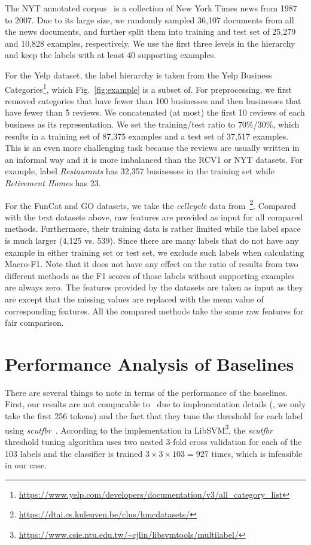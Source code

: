 \documentclass[11pt,a4paper]{article}
\begin{document}
The NYT annotated corpus~\citep{sandhaus2008new} is a collection of New York Times news from 1987 to 2007.
Due to its large size, we randomly sampled 36,107 documents from all the news documents, and further split them into training and test set of 25,279 and 10,828 examples, respectively. 
We use the first three levels in the hierarchy and keep the labels with at least 40 supporting examples.

For the Yelp dataset, the label hierarchy is taken from the Yelp Business Categories\footnote{\url{https://www.yelp.com/developers/documentation/v3/all\_category\_list}}, which Fig.~\ref{fig:example} is a subset of.
For preprocessing, we first removed categories that have fewer than 100 businesses and then businesses that have fewer than 5 reviews.
We concatenated (at most) the first 10 reviews of each business as its representation.
We set the training/test ratio to 70\%/30\%, which results in a training set of 87,375 examples and a test set of 37,517 examples.
This is an even more challenging task because the reviews are usually written in an informal way and it is more imbalanced than the RCV1 or NYT datasets.
For example, label \textit{Restaurants} has 32,357 businesses in the training set while \textit{Retirement Homes} has 23.


For the FunCat and GO datasets, we take the \textit{cellcycle} data from~\cite{vens2008decision}\footnote{\url{https://dtai.cs.kuleuven.be/clus/hmcdatasets/}}.
Compared with the text datasets above, raw features are provided as input for all compared methods.
Furthermore, their training data is rather limited while the label space is much larger (4,125 vs. 539).
Since there are many labels that do not have any example in either training set or test set, we exclude such labels when calculating Macro-F1. Note that it does not have any effect on the ratio of results from two different methods as the F1 scores of those labels without supporting examples are always zero.
The features provided by the datasets are taken as input as they are except that the missing values are replaced with the mean value of corresponding features.
All the compared methods take the same raw features for fair comparison.

\section{Performance Analysis of Baselines}
\label{app_baseline}
There are several things to note in terms of the performance of the baselines.
First, our results are not comparable to~\citet{lewis2004rcv1,johnson2014effective} due to implementation details (\eg, we only take the first 256 tokens) and the fact that they tune the threshold for each label using \textit{scutfbr}~\cite{lewis2004rcv1}.
According to the implementation in LibSVM\footnote{\url{https://www.csie.ntu.edu.tw/~cjlin/libsvmtools/multilabel/}}, the \textit{scutfbr} threshold tuning algorithm uses two nested 3-fold cross validation for each of the 103 labels and the classifier is trained $3 \times 3 \times 103 = 927$ times, which is infeasible in our case.
\end{document}
